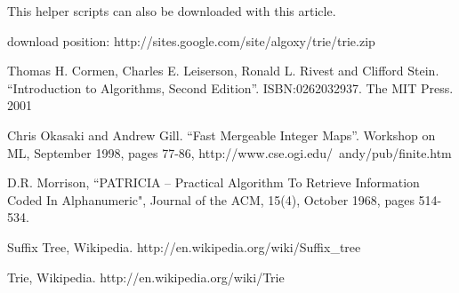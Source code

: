 \documentclass{article}
\begin{document}
This helper scripts can also be downloaded with this article.

download position: http://sites.google.com/site/algoxy/trie/trie.zip

\begin{thebibliography}{99}

Thomas H. Cormen, Charles E. Leiserson, Ronald L. Rivest and Clifford Stein. 
``Introduction to Algorithms, Second Edition''. ISBN:0262032937. The MIT Press. 2001

Chris Okasaki and Andrew Gill. ``Fast Mergeable Integer
Maps''. Workshop on ML, September 1998, pages 77-86, http://www.cse.ogi.edu/~andy/pub/finite.htm

D.R. Morrison, ``PATRICIA -- Practical Algorithm To Retrieve  Information Coded In Alphanumeric", Journal of the ACM, 15(4), October 1968, pages 514-534.

Suffix Tree, Wikipedia. http://en.wikipedia.org/wiki/Suffix\_tree

Trie, Wikipedia. http://en.wikipedia.org/wiki/Trie

\end{thebibliography}

\ifx\wholebook\relax\else
\end{document}
